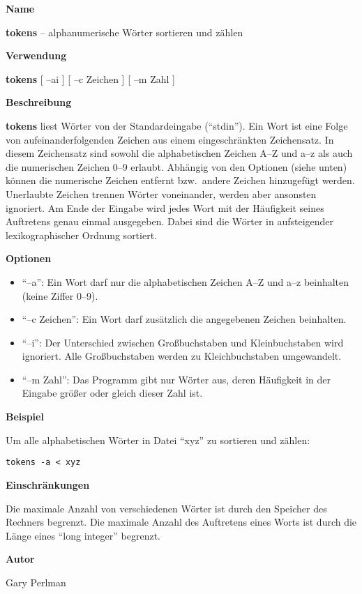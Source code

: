 
\medskip
\textbf{\large Name}

\textbf{tokens} -- alphanumerische W\"orter sortieren und z\"ahlen

\medskip
\textbf{\large Verwendung}

\textbf{tokens} [ --ai ] [ --c Zeichen ] [ --m Zahl ]


\medskip
\textbf{\large Beschreibung}

\textbf{tokens} liest W\"orter von der Standardeingabe (``stdin'').
Ein Wort ist eine Folge von aufeinanderfolgenden Zeichen aus einem
eingeschr\"ankten Zeichensatz.
In diesem Zeichensatz sind sowohl die alphabetischen Zeichen
\mbox{A--Z} und \mbox{a--z} als auch die numerischen Zeichen
\mbox{0--9} erlaubt.  
Abh\"angig von den Optionen (siehe unten) k\"onnen die numerische
Zeichen entfernt bzw.\ andere Zeichen hinzugef\"ugt werden.
Unerlaubte Zeichen trennen W\"orter voneinander, werden aber 
ansonsten ignoriert.
Am Ende der Eingabe wird jedes Wort mit der H\"aufigkeit seines
Auftretens genau einmal ausgegeben.  Dabei sind die W\"orter  
in aufsteigender lexikographischer Ordnung sortiert.


\medskip
\textbf{\large Optionen}

\begin{itemize}

\item ``--a'': Ein Wort darf nur die alphabetischen Zeichen \mbox{A--Z}
und \mbox{a--z} beinhalten (keine Ziffer 0--9).

\item ``--c Zeichen'': Ein Wort darf zus\"atzlich die angegebenen
Zeichen beinhalten.

\item ``--i'':  Der Unterschied zwischen Gro{\ss}buchstaben und
Kleinbuchstaben wird ignoriert.  Alle Gro{\ss}buchstaben werden zu
Kleichbuchstaben umgewandelt.

\item ``--m Zahl'':  Das Programm gibt nur W\"orter aus, deren
H\"aufigkeit in der Eingabe gr\"o{\ss}er oder gleich dieser Zahl ist.

\end{itemize}



\medskip
\textbf{\large Beispiel}

Um alle alphabetischen W\"orter in Datei ``xyz'' zu sortieren und
z\"ahlen: 
{\small
\begin{verbatim}
tokens -a < xyz
\end{verbatim}
}


\medskip
\textbf{\large Einschr\"ankungen}

Die maximale Anzahl von verschiedenen W\"orter ist durch den Speicher
des Rechners begrenzt.
Die maximale Anzahl des Auftretens eines Worts ist durch
die L\"ange eines ``long integer'' begrenzt.


\medskip
\textbf{\large Autor}

Gary Perlman 

